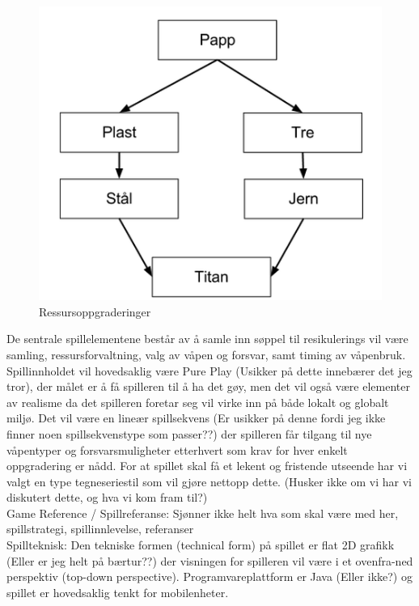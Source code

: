			\begin{figure} [here]
				\begin{center}
					\includegraphics[scale=0.5]{images/oppgraderingstre}
				\end{center}
			\caption{Ressursoppgraderinger}
		\end{figure}
		
		
De sentrale spillelementene består av å samle inn søppel til resikulerings vil være samling, ressursforvaltning, valg av våpen og forsvar, samt timing av våpenbruk. Spillinnholdet vil hovedsaklig være Pure Play (Usikker på dette innebærer det jeg tror), der målet er å få spilleren til å ha det gøy, men det vil også være elementer av realisme da det spilleren foretar seg vil virke inn på både lokalt og globalt miljø. Det vil være en lineær spillsekvens (Er usikker på denne fordi jeg ikke finner noen  spillsekvenstype som passer??) der spilleren får tilgang til nye våpentyper og forsvarsmuligheter etterhvert som krav for hver enkelt oppgradering er nådd. For at spillet skal få et lekent og fristende utseende har vi valgt en type tegneseriestil som vil gjøre nettopp dette. (Husker ikke om vi har vi diskutert dette, og hva vi kom fram til?)
\\
Game Reference / Spillreferanse: Sjønner ikke helt hva som skal være med her, spillstrategi, spillinnlevelse, referanser
\\
Spillteknisk: Den tekniske formen (technical form) på spillet er flat 2D grafikk (Eller er jeg helt på bærtur??) der visningen for spilleren vil være i et ovenfra-ned perspektiv (top-down perspective). Programvareplattform er Java (Eller ikke?) og spillet er hovedsaklig tenkt for mobilenheter.

